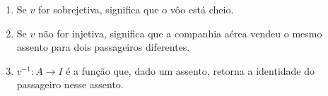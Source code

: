 \begin{enumerate}
	\item Se $v$ for sobrejetiva, significa que o vôo está cheio.
	\item Se $v$ não for injetiva, significa que a companhia aérea vendeu o mesmo 
assento para dois passageiros diferentes.
	\item $v^{-1}:A\rightarrow I$ é a função que, dado um assento, retorna a identidade 
do passageiro nesse assento.
\end{enumerate}
